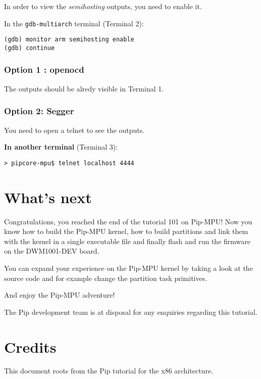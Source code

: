 \documentclass[10pt,a4paper,titlepage]{refart}
\begin{document}
In order to view the \textit{semihosting} outputs, you need to enable it.

In the \texttt{gdb-multiarch} terminal (Terminal 2):
\begin{lstlisting}[style=BashStyle]
(gdb) monitor arm semihosting enable
(gdb) continue
\end{lstlisting}

\subsubsection{Option 1 : openocd}
The outputs should be alredy visible in Terminal 1.

\subsubsection{Option 2: Segger}
You need to open a telnet to see the outputs.

\textbf{In another terminal} (Terminal 3):
\begin{lstlisting}[style=BashStyle]
> pipcore-mpu$ telnet localhost 4444
\end{lstlisting}

\section{What's next}
Congratulations, you reached the end of the tutorial 101 on Pip-MPU!
Now you know how to build the Pip-MPU kernel, how to build partitions and link them with the kernel in a single executable file and finally flash and run the firmware on the DWM1001-DEV board.

You can expand your experience on the Pip-MPU kernel by taking a look at the source code and for example change the partition task primitives.

And enjoy the Pip-MPU adventure!



The Pip development team is at disposal for any enquiries regarding this tutorial.


\section{Credits}
This document roots from the Pip tutorial for the x86 architecture.
\end{document}
